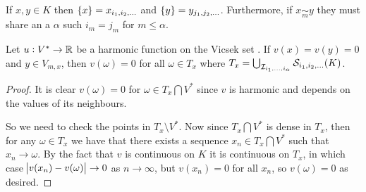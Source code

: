 \vspace{1em}
	If $x, y \in K$ then $\cbr{x} = x_{i_1, i_2, \ldots}$ and $\cbr{y} = y_{j_1, j_2, \ldots}$. Furthermore, if $x \underset{m}{\sim} y$ they must share an a $\alpha$ such $i_m = j_m$ for $m \leq \alpha$. 
	\setcounter{chapter}{2}
	\setcounter{theorem}{13}
	\begin{lemma}
		Let $u: V^{*} \to \mathbb{R}$ be a harmonic function on the Vicsek set . If $v(x) = v(y) = 0$ and $y \in V_{m,x}$, then $v(\omega) = 0$ for all $\omega \in T_x$ where $T_x = \bigcup_{\mathcal{I}_{i_1, \ldots, i_\alpha}} \mathcal{S}_{i_1, i_2, \ldots}(K)$.
	\end{lemma}
	\begin{proof}
		It is clear $v(\omega) = 0$ for $\omega \in T_x \bigcap V^{*}$ since $v$ is harmonic and depends on the values of its neighbours.
		
		So we need to check the points in $T_x \setminus V^{*}$. Now since $T_x \bigcap V^{*}$ is dense in $T_x$, then for any $\omega \in T_x$ we have that there exists a sequence $x_n \in T_x \bigcap V^{*}$ such that $x_n \to \omega$. By the fact that $v$ is continuous on $K$ it is continuous on $T_x$, in which case $\abs{v(x_n) - v(\omega)} \to 0$ as $n \to \infty$, but $v(x_n) = 0$ for all $x_n$, so $v(\omega) = 0$ as desired. 
	\end{proof}

